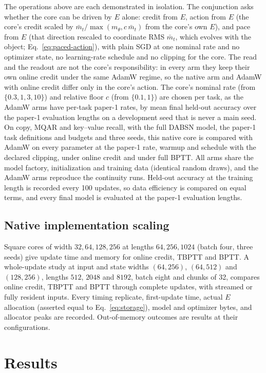 \documentclass[11pt]{article}
\theoremstyle{definition}
\begin{document}
The operations above are each demonstrated in isolation. The conjunction asks
whether the core can be driven by $E$ alone: credit from $E$, action from $E$ (the
core's credit scaled by $\bar m_t/\max(m_\theta,c\,\bar m_t)$ from the core's own $E$),
and pace from $E$ (that direction rescaled to coordinate RMS $\bar m_t$, which evolves
with the object; Eq.~\eqref{eq:paced-action}), with plain SGD at one nominal rate and no optimizer state, no
learning-rate schedule and no clipping for the core. The read and the readout are
not the core's responsibility: in every arm they keep their own online credit under
the same AdamW regime, so the native arm and AdamW with online credit differ only in
the core's action. The core's nominal rate (from $\{0.3,1,3,10\}$) and
relative floor $c$ (from $\{0.1,1\}$) are chosen per task, as the AdamW arms have
per-task paper-1 rates, by mean final held-out accuracy over the paper-1
evaluation lengths on a development seed that is never a main seed. On copy, MQAR and key--value recall, with the full DABSN model,
the paper-1 task definitions and budgets and three seeds, this native core is
compared with AdamW on every parameter at the paper-1 rate, warmup and schedule with
the declared clipping, under online credit and under full BPTT. All arms share the
model factory, initialization and training data (identical random draws), and the
AdamW arms reproduce the continuity runs. Held-out accuracy at the training length
is recorded every 100 updates, so data efficiency is compared on equal terms, and
every final model is evaluated at the paper-1 evaluation lengths.

\subsection{Native implementation scaling}
\label{sec:resource}

Square cores of width $32,64,128,256$ at lengths $64,256,1024$ (batch four, three
seeds) give update time and memory for online credit, TBPTT and BPTT. A whole-update
study at input and state widths $(64,256)$, $(64,512)$ and $(128,256)$, lengths
$512$, $2048$ and $8192$, batch eight
and chunks of 32, compares online credit, TBPTT and BPTT through complete updates,
with streamed or fully resident inputs. Every timing replicate, first-update time,
actual $E$ allocation (asserted equal to Eq.~\eqref{eq:storage}), model and
optimizer bytes, and allocator peaks are recorded. Out-of-memory outcomes are
results at their configurations.

\section{Results}
\label{sec:results}
\end{document}
